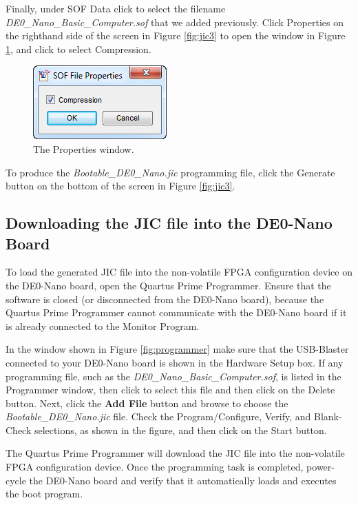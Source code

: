 \documentclass[11pt, twoside, pdftex]{article}
\begin{document}
Finally, under {\sf SOF Data} click to select the filename 
{\it DE0\_Nano\_Basic\_Computer.sof} that we added previously. Click {\sf Properties}
on the righthand side of the screen in Figure \ref{fig:jic3} to open the window in 
Figure \ref{fig:jic5}, and click to select {\sf Compression}.

\begin{figure}[H]
   \begin{center}
        \includegraphics[scale=.6]{figures/jic5.png}
   \end{center}
   \caption{The Properties window.}
	\label{fig:jic5}
\end{figure}

To produce the {\it Bootable\_DE0\_Nano.jic} programming file, click the {\sf Generate} button
on the bottom of the screen in Figure \ref{fig:jic3}.

\subsection{Downloading the JIC file into the DE0-Nano Board}

To load the generated JIC file into the non-volatile FPGA configuration device on the DE0-Nano
board, open the Quartus Prime Programmer. Ensure that the \productNameMed{} software
is closed (or disconnected from the DE0-Nano board), because the Quartus Prime 
Programmer cannot communicate with the DE0-Nano board if it is already connected to 
the Monitor Program.

In the window shown in Figure \ref{fig:programmer} make sure that the 
USB-Blaster connected to your DE0-Nano
board is shown in the {\sf Hardware Setup} box. If any programming file, such as the 
{\it DE0\_Nano\_Basic\_Computer.sof}, is listed in the Programmer window, then click to
select this file and then click on the {\sf Delete} button. Next, click the {\bf Add File}
button and browse to choose the {\it Bootable\_DE0\_Nano.jic} file. Check the
{\sf Program/Configure}, {\sf Verify}, and {\sf Blank-Check} selections, as shown in the 
figure, and then click on the {\sf Start} button.

The Quartus Prime Programmer will download the JIC file into the non-volatile FPGA
configuration device. Once the programming task is completed, power-cycle the DE0-Nano
board and verify that it automatically loads and executes the boot program.
\end{document}
